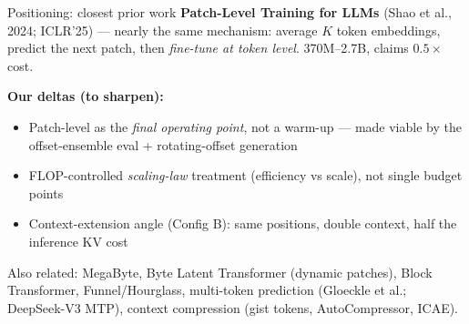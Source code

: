 \documentclass[10pt,aspectratio=169]{beamer}
\begin{document}
\begin{frame}{Positioning: closest prior work}
  \textbf{Patch-Level Training for LLMs} (Shao et al., 2024; ICLR'25) ---
  nearly the same mechanism: average $K$ token embeddings, predict the next
  patch, then \emph{fine-tune at token level}. 370M--2.7B, claims
  $0.5\times$ cost.

  \vspace{0.4em}
  \textbf{Our deltas (to sharpen):}
  \begin{itemize}
    \item Patch-level as the \emph{final operating point}, not a warm-up ---
          made viable by the offset-ensemble eval + rotating-offset generation
    \item FLOP-controlled \emph{scaling-law} treatment (efficiency vs scale),
          not single budget points
    \item Context-extension angle (Config B): same positions, double context,
          half the inference KV cost
  \end{itemize}

  \vspace{0.4em}
  \small Also related: MegaByte, Byte Latent Transformer (dynamic patches),
  Block Transformer, Funnel/Hourglass, multi-token prediction
  (Gloeckle et al.; DeepSeek-V3 MTP), context compression (gist tokens,
  AutoCompressor, ICAE).
\end{frame}
\end{document}
